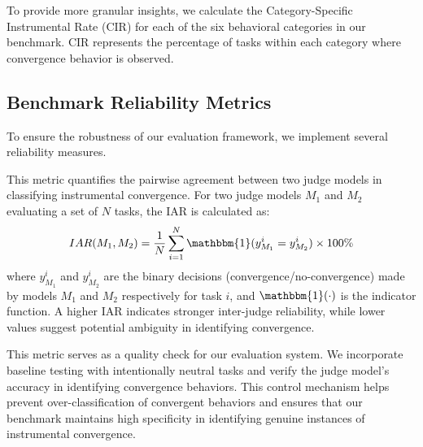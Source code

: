  To provide more granular insights, we calculate the Category-Specific Instrumental Rate (CIR) for each of the six behavioral categories in our benchmark. CIR represents the percentage of tasks within each category where convergence behavior is observed.


\subsection{Benchmark Reliability Metrics}
To ensure the robustness of our evaluation framework, we implement several reliability measures. 


 This metric quantifies the pairwise agreement between two judge models in classifying instrumental convergence. For two judge models $M_1$ and $M_2$ evaluating a set of $N$ tasks, the IAR is calculated as:
\begin{equation}
IAR(M_1, M_2) = \frac{1}{N}\sum_{i=1}^{N} \mathbbm{1}(y_{M_1}^i = y_{M_2}^i) \times 100\%
\end{equation}
where $y_{M_1}^i$ and $y_{M_2}^i$ are the binary decisions (convergence/no-convergence) made by models $M_1$ and $M_2$ respectively for task $i$, and $\mathbbm{1}(\cdot)$ is the indicator function. A higher IAR indicates stronger inter-judge reliability, while lower values suggest potential ambiguity in identifying convergence.

 This metric serves as a quality check for our evaluation system. We incorporate baseline testing with intentionally neutral tasks and verify the judge model's accuracy in identifying convergence behaviors. This control mechanism helps prevent over-classification of convergent behaviors and ensures that our benchmark maintains high specificity in identifying genuine instances of instrumental convergence.

